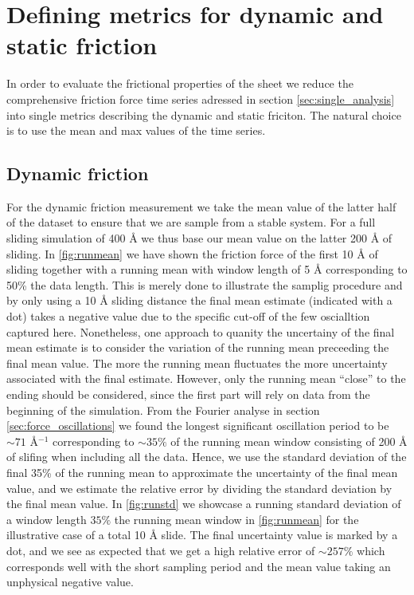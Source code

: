 \section{Defining metrics for dynamic and static friction}\label{sec:def_dyn_and_stat}

In order to evaluate the frictional properties of the sheet we reduce the comprehensive friction force time series adressed in section \cref{sec:single_analysis} into single metrics describing the dynamic and static friciton. The natural choice is to use the mean and max values of the time series. 

\subsection{Dynamic friction} 
For the dynamic friction measurement we take the mean value of the latter half
of the dataset to ensure that we are sample from a stable system. For a full
sliding simulation of 400 Å we thus base our mean value on the latter 200 Å of
sliding. In \cref{fig:runmean} we have shown the friction force of the
first 10 Å of sliding together with a running mean with window length of 5 Å
corresponding to 50\% the data length. This is merely done to illustrate the
samplig procedure and by only using a 10 Å sliding distance the final mean
estimate (indicated with a dot) takes a negative value due to the specific cut-off of the
few oscialltion captured here. Nonetheless, one approach to quanity the
uncertainy of the final mean estimate is to consider the variation of the
running mean preceeding the final mean value. The more the running mean
fluctuates the more uncertainty associated with the final estimate. However, only the
running mean ``close'' to the ending should be considered, since the first part
will rely on data from the beginning of the simulation. From the Fourier analyse
in section \cref{sec:force_oscillations} we found the longest significant
oscillation period to be $\sim 71$ Å$^{-1}$ corresponding to $\sim 35 \%$ of the
running mean window consisting of 200 Å of slifing when including all the data.  Hence, we use the standard deviation of the final 35\% of the running mean to approximate the
uncertainty of the final mean value, and we estimate the relative error by
dividing the standard deviation by the final mean value. In \cref{fig:runstd} we showcase a running standard deviation of a window length $35 \%$ the running mean window in \cref{fig:runmean} for the illustrative case of a total 10 Å slide. The final uncertainty value is marked by a dot, and we see as expected that we get a high relative error of $\sim 257\%$ which corresponds well with the short sampling period and the mean value taking an unphysical negative value. 



